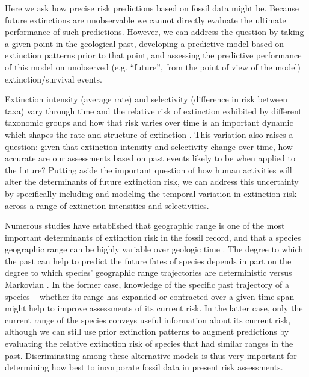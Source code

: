 \documentclass[12pt,letterpaper]{article}
\begin{document}
\begin{refsection}
Here we ask how precise risk predictions based on fossil data might be. Because future extinctions are unobservable we cannot directly evaluate the ultimate performance of such predictions. However, we can address the question by taking a given point in the geological past, developing a predictive model based on extinction patterns prior to that point, and assessing the predictive performance of this model on unobserved (e.g. ``future'', from the point of view of the model) extinction/survival events.

Extinction intensity (average rate) and selectivity (difference in risk between taxa) vary through time and the relative risk of extinction exhibited by different taxonomic groups and how that risk varies over time is an important dynamic which shapes the rate and structure of extinction \citep{Payne2007,Payne2016,Ezard2011,Smits2019}. This variation also raises a question: given that extinction intensity and selectivity change over time, how accurate are our assessments based on past events likely to be when applied to the future? Putting aside the important question of how human activities will alter the determinants of future extinction risk, we can address this uncertainty by specifically including and modeling the temporal variation in extinction risk across a range of extinction intensities and selectivities.

Numerous studies have established that geographic range is one of the most important determinants of extinction risk in the fossil record, and that a species geographic range can be highly variable over geologic time \citep{Foote2007,Liow2010,Liow2007,Kiessling2013,Payne2007,Jablonski2003,Jablonski2008,Jablonski2006}. The degree to which the past can help to predict the future fates of species depends in part on the degree to which species’ geographic range trajectories are deterministic versus Markovian \citep{Liow2007,Kiessling2013,Foote2007b,Pigot2012}. In the former case, knowledge of the specific past trajectory of a species -- whether its range has expanded or contracted over a given time span -- might help to improve assessments of its current risk. In the latter case, only the current range of the species conveys useful information about its current risk, although we can still use prior extinction patterns to augment predictions by evaluating the relative extinction risk of species that had similar ranges in the past. Discriminating among these alternative models is thus very important for determining how best to incorporate fossil data in present risk assessments.


\end{refsection}
\end{document}

